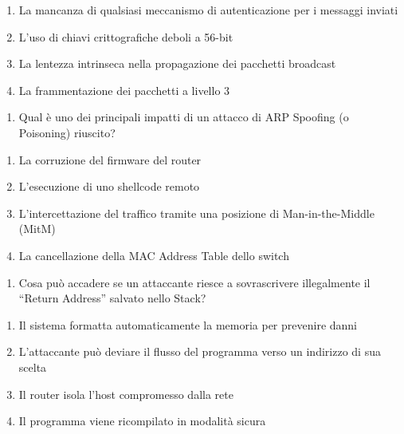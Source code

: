 \documentclass[11pt,a4paper]{article}
\providecommand{\tightlist}{%
  \setlength{\itemsep}{0pt}\setlength{\parskip}{0pt}}
\begin{document}
\begin{enumerate}
\def\labelenumi{\Alph{enumi})}
\tightlist
\item
  La mancanza di qualsiasi meccanismo di autenticazione per i messaggi
  inviati
\item
  L'uso di chiavi crittografiche deboli a 56-bit
\item
  La lentezza intrinseca nella propagazione dei pacchetti broadcast
\item
  La frammentazione dei pacchetti a livello 3
\end{enumerate}

\begin{enumerate}
\def\labelenumi{\arabic{enumi}.}
\setcounter{enumi}{6}
\tightlist
\item
  Qual è uno dei principali impatti di un attacco di ARP Spoofing (o
  Poisoning) riuscito?
\end{enumerate}

\begin{enumerate}
\def\labelenumi{\Alph{enumi})}
\tightlist
\item
  La corruzione del firmware del router
\item
  L'esecuzione di uno shellcode remoto
\item
  L'intercettazione del traffico tramite una posizione di
  Man-in-the-Middle (MitM)
\item
  La cancellazione della MAC Address Table dello switch
\end{enumerate}

\begin{enumerate}
\def\labelenumi{\arabic{enumi}.}
\setcounter{enumi}{7}
\tightlist
\item
  Cosa può accadere se un attaccante riesce a sovrascrivere illegalmente
  il ``Return Address'' salvato nello Stack?
\end{enumerate}

\begin{enumerate}
\def\labelenumi{\Alph{enumi})}
\tightlist
\item
  Il sistema formatta automaticamente la memoria per prevenire danni
\item
  L'attaccante può deviare il flusso del programma verso un indirizzo di
  sua scelta
\item
  Il router isola l'host compromesso dalla rete
\item
  Il programma viene ricompilato in modalità sicura
\end{enumerate}
\end{document}

